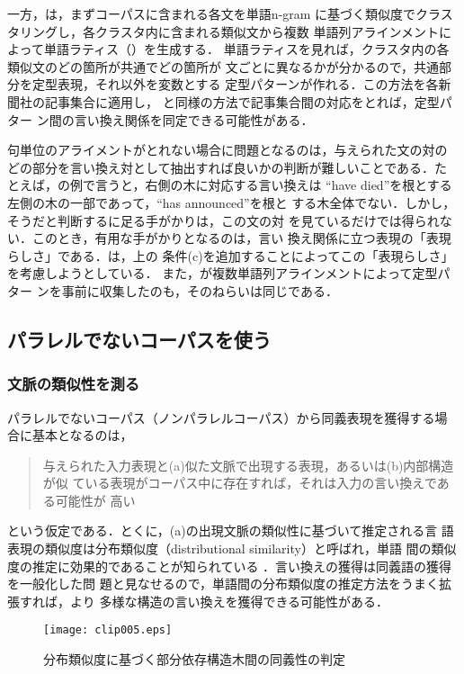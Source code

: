 一方，は，まずコーパスに含まれる各文を単語n-gram 
に基づく類似度でクラスタリングし，各クラスタ内に含まれる類似文から複数
単語列アラインメントによって単語ラティス（）を生成する．
単語ラティスを見れば，クラスタ内の各類似文のどの箇所が共通でどの箇所が
文ごとに異なるかが分かるので，共通部分を定型表現，それ以外を変数とする
定型パターンが作れる．この方法を各新聞社の記事集合に適用し，
と同様の方法で記事集合間の対応をとれば，定型パター
ン間の言い換え関係を同定できる可能性がある．

句単位のアライメントがとれない場合に問題となるのは，与えられた文の対の
どの部分を言い換え対として抽出すれば良いかの判断が難しいことである．た
とえば，の例で言うと，右側の木に対応する言い換えは
``have died''を根とする左側の木の一部であって，``has announced''を根と
する木全体でない．しかし，そうだと判断するに足る手がかりは，この文の対
を見ているだけでは得られない．このとき，有用な手がかりとなるのは，言い
換え関係に立つ表現の「表現らしさ」である．は，上の
条件(c)を追加することによってこの「表現らしさ」を考慮しようとしている．
また，が複数単語列アラインメントによって定型パター
ンを事前に収集したのも，そのねらいは同じである．

\subsection{パラレルでないコーパスを使う}

\subsubsection{文脈の類似性を測る}

パラレルでないコーパス（ノンパラレルコーパス）から同義表現を獲得する場
合に基本となるのは，
\begin{quote}
与えられた入力表現と(a)似た文脈で出現する表現，あるいは(b)内部構造が似
ている表現がコーパス中に存在すれば，それは入力の言い換えである可能性が
高い
\end{quote}
という仮定である．とくに，(a)の出現文脈の類似性に基づいて推定される言
語表現の類似度は分布類似度（distributional similarity）と呼ばれ，単語
間の類似度の推定に効果的であることが知られている
\cite{pereira:93,lin:98:a}．言い換えの獲得は同義語の獲得を一般化した問
題と見なせるので，単語間の分布類似度の推定方法をうまく拡張すれば，より
多様な構造の言い換えを獲得できる可能性がある．

\begin{figure}[t]
\begin{center}
\leavevmode
\texttt{[image: clip005.eps]}
\caption{分布類似度に基づく部分依存構造木間の同義性の判定\cite{lin:01}}
\label{fig:dirt}
\end{center}
\end{figure}

